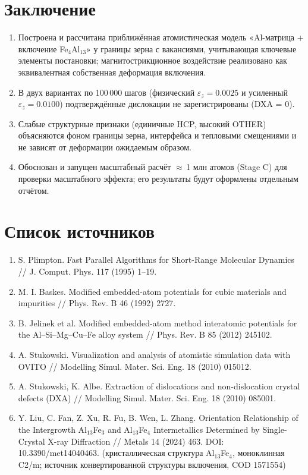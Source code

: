 \documentclass[14pt,a4paper]{extarticle}
\begin{document}
\section{Заключение}
\begin{enumerate}[leftmargin=1.8em,itemsep=1pt]
\item Построена и рассчитана приближённая атомистическая модель «Al-матрица + включение Fe$_4$Al$_{13}$» у границы зерна с вакансиями, учитывающая ключевые элементы постановки; магнитострикционное воздействие реализовано как эквивалентная собственная деформация включения.
\item В двух вариантах по 100\,000 шагов (физический $\varepsilon_z = 0.0025$ и усиленный $\varepsilon_z = 0.0100$) подтверждённые дислокации не зарегистрированы (DXA = 0).
\item Слабые структурные признаки (единичные HCP, высокий OTHER) объясняются фоном границы зерна, интерфейса и тепловыми смещениями и не зависят от деформации ожидаемым образом.
\item Обоснован и запущен масштабный расчёт $\approx$\,1 млн атомов (Stage C) для проверки масштабного эффекта; его результаты будут оформлены отдельным отчётом.
\end{enumerate}

\section{Список источников}
\begin{enumerate}[leftmargin=1.8em,itemsep=1pt]
\item S. Plimpton. Fast Parallel Algorithms for Short-Range Molecular Dynamics // J. Comput. Phys. 117 (1995) 1–19.
\item M. I. Baskes. Modified embedded-atom potentials for cubic materials and impurities // Phys. Rev. B 46 (1992) 2727.
\item B. Jelinek et al. Modified embedded-atom method interatomic potentials for the Al–Si–Mg–Cu–Fe alloy system // Phys. Rev. B 85 (2012) 245102.
\item A. Stukowski. Visualization and analysis of atomistic simulation data with OVITO // Modelling Simul. Mater. Sci. Eng. 18 (2010) 015012.
\item A. Stukowski, K. Albe. Extraction of dislocations and non-dislocation crystal defects (DXA) // Modelling Simul. Mater. Sci. Eng. 18 (2010) 085001.
\item Y. Liu, C. Fan, Z. Xu, R. Fu, B. Wen, L. Zhang. Orientation Relationship of the Intergrowth Al$_{13}$Fe$_3$ and Al$_{13}$Fe$_4$ Intermetallics Determined by Single-Crystal X-ray Diffraction // Metals 14 (2024) 463. DOI: 10.3390/met14040463. (кристаллическая структура Al$_{13}$Fe$_4$, моноклинная C2/m; источник конвертированной структуры включения, COD 1571554)
\end{enumerate}
\end{document}
